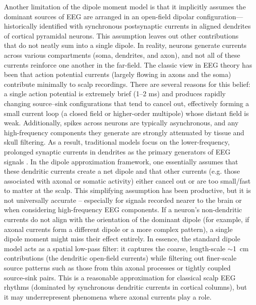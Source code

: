 \documentclass[final, a4paper,masters,en,listoffigures,listoftables,norwegiandates]{NMBU}
\begin{document}
Another limitation of the dipole moment model is that it implicitly assumes the dominant sources of EEG are arranged in an open-field dipolar configuration—historically identified with synchronous postsynaptic currents in aligned dendrites of cortical pyramidal neurons. This assumption leaves out other contributions that do not neatly sum into a single dipole. In reality, neurons generate currents across various compartments (soma, dendrites, and axon), and not all of these currents reinforce one another in the far-field. The classic view in EEG theory has been that action potential currents (largely flowing in axons and the soma) contribute minimally to scalp recordings. There are several reasons for this belief: a single action potential is extremely brief (1–2 ms) and produces rapidly changing source–sink configurations that tend to cancel out, effectively forming a small current loop (a closed field or higher-order multipole) whose distant field is weak. Additionally, spikes across neurons are typically asynchronous, and any high-frequency components they generate are strongly attenuated by tissue and skull filtering. As a result, traditional models focus on the lower-frequency, prolonged synaptic currents in dendrites as the primary generators of EEG signals \cite{Buzsaki2012}. In the dipole approximation framework, one essentially assumes that these dendritic currents create a net dipole and that other currents (e.g. those associated with axonal or somatic activity) either cancel out or are too small/fast to matter at the scalp. This simplifying assumption has been productive, but it is not universally accurate – especially for signals recorded nearer to the brain or when considering high-frequency EEG components. If a neuron’s non-dendritic currents do not align with the orientation of the dominant dipole (for example, if axonal currents form a different dipole or a more complex pattern), a single dipole moment might miss their effect entirely. In essence, the standard dipole model acts as a spatial low-pass filter: it captures the coarse, length-scale $\sim$1~cm contributions (the dendritic open-field currents) while filtering out finer-scale source patterns such as those from thin axonal processes or tightly coupled source-sink pairs. This is a reasonable approximation for classical scalp EEG rhythms (dominated by synchronous dendritic currents in cortical columns), but it may underrepresent phenomena where axonal currents play a role.
\end{document}
